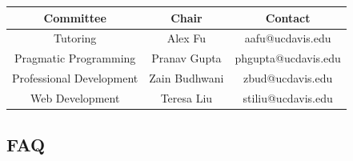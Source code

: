 \documentclass{article}
\begin{document}
\begin{center}
\begin{tabular} {|c|c|c|}
\hline
\textbf{Committee} & \textbf{Chair} & \textbf{Contact} \\
\hline
Tutoring & Alex Fu & aafu@ucdavis.edu \\
\hline
Pragmatic Programming & Pranav Gupta & phgupta@ucdavis.edu \\
\hline
Professional Development & Zain Budhwani & zbud@ucdavis.edu\\
\hline
Web Development & Teresa Liu & stiliu@ucdavis.edu \\
\hline
\end{tabular}
\end{center}
\subsection{FAQ}
\end{document}
